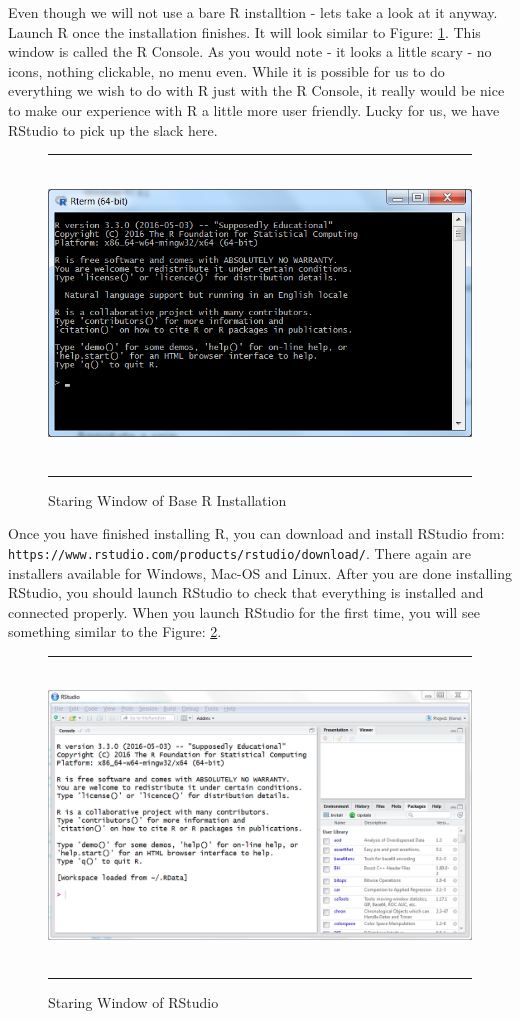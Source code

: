 \documentclass[11pt, letterpaper, twoside]{memoir}\usepackage{knitr}
\begin{document}
Even though we will not use a bare R installtion - lets take a look at it anyway. Launch R once the installation finishes. It will look similar to Figure: \ref{fig:rbase}. This window is called the R Console. As you would note - it looks a little scary - no icons, nothing clickable, no menu even. While it is possible for us to do everything we wish to do with R just with the R Console, it really would be nice to make our experience with R a little more user friendly. Lucky for us, we have RStudio to pick up the slack here.

\begin{figure}
\rule{4in}{1pt}
\centering
\includegraphics[height=3in]{images/rbase.png}
\caption{Staring Window of Base R Installation}
\label{fig:rbase}
\rule{4in}{1pt}
\end{figure}

Once you have finished installing R, you can download and install RStudio from: \\ 
\verb|https://www.rstudio.com/products/rstudio/download/|. There again are installers available for Windows, Mac-OS and Linux. After you are done installing RStudio, you should launch RStudio to check that everything is installed and connected properly. When you launch RStudio for the first time, you will see something similar to the Figure: \ref{fig:rstudio}.

\begin{figure}
\rule{4in}{1pt}
\centering
\includegraphics[height=3in]{images/rstudio.png}
\caption{Staring Window of RStudio}
\label{fig:rstudio}
\rule{4in}{1pt}
\end{figure}
\end{document}
